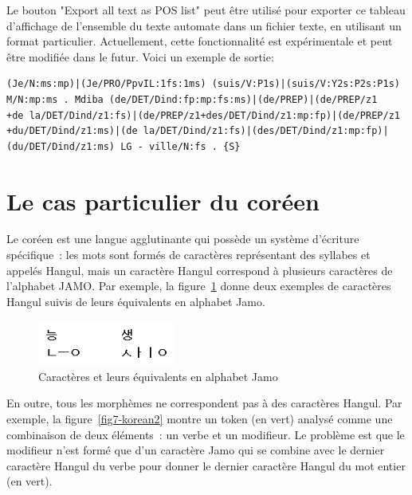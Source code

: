 \bigskip
\noindent Le bouton "Export all text as POS list" peut être utilisé pour exporter ce tableau d'affichage de l'ensemble du texte automate dans un fichier texte, en utilisant un format particulier. Actuellement, cette fonctionnalité est expérimentale et peut être modifiée dans le futur. Voici un exemple de sortie:

\begin{verbatim}
(Je/N:ms:mp)|(Je/PRO/PpvIL:1fs:1ms) (suis/V:P1s)|(suis/V:Y2s:P2s:P1s) 
M/N:mp:ms . Mdiba (de/DET/Dind:fp:mp:fs:ms)|(de/PREP)|(de/PREP/z1
+de la/DET/Dind/z1:fs)|(de/PREP/z1+des/DET/Dind/z1:mp:fp)|(de/PREP/z1
+du/DET/Dind/z1:ms)|(de la/DET/Dind/z1:fs)|(des/DET/Dind/z1:mp:fp)|
(du/DET/Dind/z1:ms) LG - ville/N:fs . {S}
\end{verbatim}



\section{Le cas particulier du coréen}
\label{section-korean}
Le coréen est une langue  agglutinante qui possède un système d'écriture spécifique~: les mots sont
formés de caractères représentant des syllabes et appelés Hangul, mais un caractère Hangul correspond à
plusieurs caractères de l'alphabet JAMO. Par exemple, la figure~\ref{fig7-korean1} donne deux exemples
de caractères Hangul suivis de leurs équivalents en alphabet Jamo.

\begin{figure}[!ht]
\begin{center}
\includegraphics[width=4.5cm]{resources/img/fig7-korean1.png}
\caption{Caractères et leurs équivalents en alphabet Jamo
\label{fig7-korean1}}
\end{center}
\end{figure}

\noindent En outre, tous les morphèmes ne  correspondent pas à des caractères Hangul.
Par exemple, la figure~\ref{fig7-korean2} montre un token (en vert) analysé
comme une combinaison de deux éléments~: un verbe et un modifieur.
Le problème est que le modifieur n'est formé que d'un caractère Jamo qui se
combine avec le dernier caractère Hangul du verbe pour donner le dernier caractère
Hangul du mot entier (en vert). 

